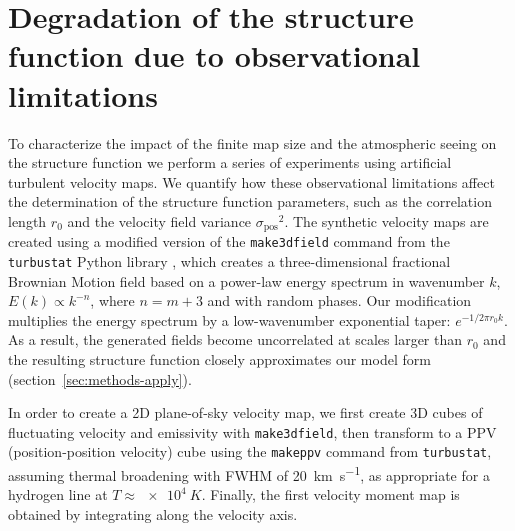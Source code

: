 \documentclass[fleqn,usenatbib, useAMS, a4paper]{mnras}
\newcommand\startNEW{\color{NEWcolor}}
\newcommand\stopNEW{\color{black}}
\newcommand\NEW[1]{\startNEW #1\stopNEW\relax}
\newcommand\pos{\ensuremath{_{\mathrm{pos}}}}
\begin{document}





\appendix

\renewcommand\textfraction{0.0}
\renewcommand\topfraction{1.0}
\renewcommand\bottomfraction{1.0}

\startNEW
\section{Degradation of the structure function due to observational limitations}
\label{sec:degr-struct-funct}
\stopNEW

To characterize the impact of the finite map size
and the atmospheric seeing on the structure function we perform a series of experiments using artificial turbulent velocity maps.
We quantify how these observational limitations affect the determination of
the structure function parameters, such as
the correlation length \(r_0\) and the velocity field variance \(\sigma\pos^2\). 
The synthetic velocity maps are created using a modified version of the \NEW{\texttt{make\textunderscore{}3dfield}} command from the \texttt{turbustat} Python library \citep{Koch2019AJ....158....1K},
which creates a \NEW{three-dimensional} fractional Brownian Motion field
\citep{Miville-Deschenes:2003a}
based on a power-law energy spectrum in wavenumber \(k\), \(E(k) \propto k^{-n}\),
where \NEW{\(n = m + 3\)} and with random phases. 
Our modification multiplies the energy spectrum by a
low-wavenumber exponential taper:
\(e^{-1 / 2 \pi r_0 k}\).
As a result, the generated fields become uncorrelated at scales larger than \(r_0\)
and the resulting structure function closely approximates our model form
(section~\ref{sec:methods-apply}).

\startNEW
In order to create a 2D plane-of-sky velocity map, we first
create 3D cubes of fluctuating velocity and emissivity
with \texttt{make\textunderscore{}3dfield},
then transform to a PPV (position-position velocity) cube
using the \texttt{make\textunderscore{}ppv} command from \texttt{turbustat},
assuming thermal broadening with FWHM of \SI{20}{\kilo\meter\per\second},
as appropriate for a hydrogen line at \(T \approx \SI{e4}{K}\).
Finally, the first velocity moment map is obtained
by integrating along the velocity axis.
\end{document}
